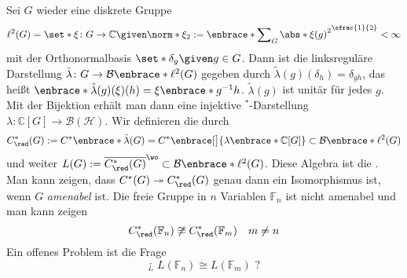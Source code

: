 \begin{beispiel}[{name=[Gruppen-von-Neumann-Algebra]}]
	Sei $G$ wieder eine diskrete Gruppe
	\[
		\ell^2(G) = \set*{\xi \colon G \to \mathbb{C} \given \norm*{\xi}_2 := \enbrace*{\sum\nolimits_G \abs*{\xi(g)}^2 }^{\sfrac{1}{2}} < \infty}
	\]
	mit der Orthonormalbasis $\set*{\delta_g \given g \in G}$. Dann ist die linksreguläre Darstellung $\tilde{\lambda} \colon G \to \mathcal{B} \enbrace*{\ell^2(G)}$ gegeben durch $\tilde{\lambda}(g)(\delta_h) = \delta_{gh}$, das heißt $\enbrace*{\tilde{\lambda}(g)(\xi)}(h) = \xi \enbrace*{g ^{-1}h}$.
	$\tilde{\lambda}(g)$ ist unitär für jedes $g$. 
	Mit der Bijektion erhält man dann eine injektive $^*$-Darstellung $\lambda \colon \mathbb{C}[G] \to \mathcal{B}(\mathcal{H})$.
	Wir definieren die  durch
	\[
		C^*_{\red}(G) := C^* \enbrace*{\tilde{\lambda}(G)}= C^* \enbrace[\big]{\lambda \enbrace*{\mathbb{C}[G]}} \subset \mathcal{B} \enbrace*{\ell^2(G)}
	\]
	und weiter $L(G) := \overline{C^*_{\red}(G)}^\wo \subset \mathcal{B} \enbrace*{\ell^2(G)}$. 
	Diese Algebra ist die .
	Man kann zeigen, dass $C^*(G) \twoheadrightarrow C^*_{\red}(G)$ genau dann ein Isomorphismus ist, wenn $G$ \emph{amenabel} ist.
	Die freie Gruppe in $n$ Variablen $\mathbb{F}_n$ ist nicht amenabel und man kann zeigen
	\[
		C^*_{\red}(\mathbb{F}_n) \not\cong C^*_{\red}(\mathbb{F}_m) \quad m \neq n
	\]
	Ein offenes Problem ist die Frage 
	\[
		\text{¿ } L(\mathbb{F}_n) \cong L (\mathbb{F}_m) \text{ ?}  
	\]
\end{beispiel}

